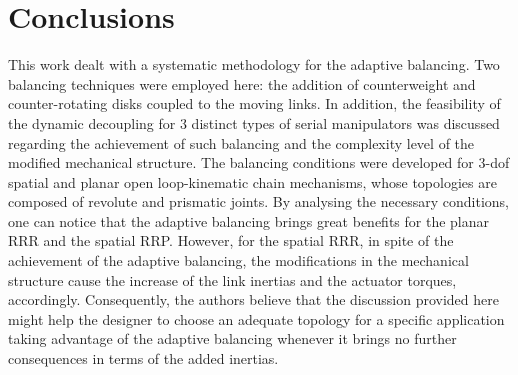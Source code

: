 \documentclass[a4paper,11pt,brazil,fleqn]{article}
\begin{document}


\section{Conclusions}\label{S04}

This work dealt with a systematic methodology for the adaptive balancing. Two balancing techniques were employed here: the addition of counterweight and counter-rotating disks coupled to the moving links. In addition, the feasibility of the dynamic decoupling for 3 distinct types of serial manipulators was discussed regarding the achievement of such balancing and the complexity level of the modified mechanical structure. The balancing conditions were developed for 3-dof spatial and planar open loop-kinematic chain mechanisms, whose topologies are composed of revolute and prismatic joints. By analysing the necessary conditions, one can notice that the adaptive balancing  brings great benefits for the planar RRR and the spatial RRP. However, for the spatial RRR, in spite of the achievement of the adaptive balancing, the modifications in the mechanical structure cause the increase of the link inertias and the actuator torques, accordingly. Consequently, the authors believe that the discussion provided here might help the designer to choose an adequate topology for a specific application taking advantage of the adaptive balancing whenever it brings no further consequences in terms of the added inertias.





{} 



\end{document}
